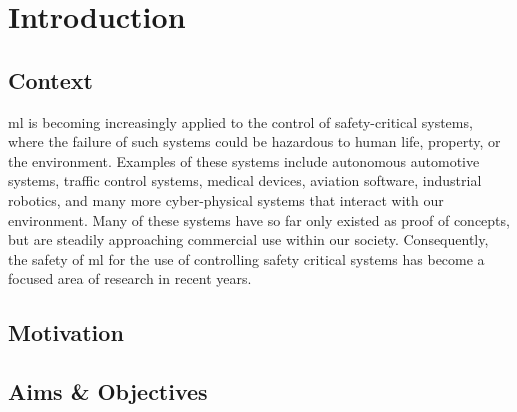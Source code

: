 
\chapter{Introduction} %
\label{Chapter1} %



\section{Context}

\Gls{ml} is becoming increasingly applied to the control of safety-critical systems, where the failure of such systems could be hazardous to human life, property, or the environment.
Examples of these systems include autonomous automotive systems, traffic control systems, medical devices, aviation software, industrial robotics, and many more cyber-physical systems that interact with our environment.
Many of these systems have so far only existed as proof of concepts, but are steadily approaching commercial use within our society.
Consequently, the safety of \gls{ml} for the use of controlling safety critical systems has become a focused area of research in recent years.

\section{Motivation}
\section{Aims \& Objectives}
